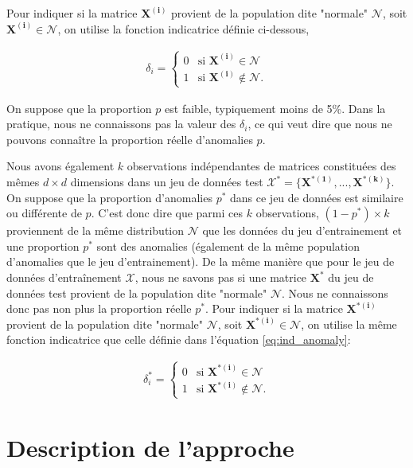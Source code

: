  \DIFaddend Pour indiquer si la matrice $\boldsymbol{X^{(i)}}$ provient de la population dite "normale" $\mathcal{N}$, soit $ \boldsymbol{X^{(i)}}\in\mathcal{N}$, on utilise la fonction indicatrice définie ci-dessous,

\begin{gather*}  \label{eq:ind_anomaly}
\delta_{i}=
\begin{cases}
0 & \text{si $\boldsymbol{X^{(i)}}\in\mathcal{N}$} \\
1 & \text{si $\boldsymbol{X^{(i)}}\not\in\mathcal{N}$}.
\end{cases}
\end{gather*}

On suppose que la proportion $p$ est faible, typiquement moins de 5\%. Dans la pratique, nous ne connaissons pas la valeur des $\delta_i$, ce qui veut dire que nous ne pouvons connaître la proportion réelle d'anomalies $p$. 

Nous avons également $k$ observations indépendantes de matrices constituées des mêmes $d \times d$ dimensions dans un jeu de données test $\mathcal{X^*} = \{\boldsymbol{X^{*(1)}},...,\boldsymbol{X^{*(k)}}\}$. On suppose que la proportion d'anomalies $p^*$ dans ce jeu de données est similaire ou différente de $p$. C'est donc dire que parmi ces $k$ observations, $(1-p^*) \times k$ proviennent de la même distribution $\mathcal{N}$ que les données du jeu d'entrainement et une proportion $p^*$ sont des anomalies (également de la même population d'anomalies que le jeu d'entrainement). De la même manière que pour le jeu de données d'entraînement $\mathcal{X}$, nous ne savons pas si une matrice $\boldsymbol{X^{*}}$ du jeu de données test provient de la population dite "normale" $\mathcal{N}$. Nous ne connaissons donc pas non plus la proportion réelle $p^*$. Pour indiquer si la matrice $\boldsymbol{X^{*(i)}}$ provient de la population dite "normale" $\mathcal{N}$, soit $ \boldsymbol{X^{*(i)}}\in\mathcal{N}$, on utilise la même fonction indicatrice que celle définie dans l'équation \ref{eq:ind_anomaly}:

\begin{gather}  \label{eq:ind_anomaly}
\delta^{*}_{i}=
\begin{cases}
0 & \text{si $\boldsymbol{X^{*(i)}}\in\mathcal{N}$} \\
1 & \text{si $\boldsymbol{X^{*(i)}}\not\in\mathcal{N}$}.
\end{cases}
\end{gather}


\section{Description de l'approche} \label{section:description}

